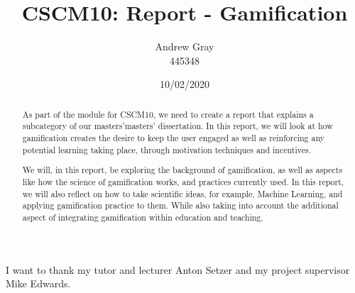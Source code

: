 \documentclass[11pt, a4paper, twoside, openright]{custard}
\begin{document}
	
	\title{CSCM10: Report - Gamification}
	\author{Andrew Gray\protect\\{\normalsize 445348}}
	
	
	
	\date{10/02/2020}
	
	\frontmatter%
	\maketitle
	\cleardoublepage

	\begin{abstract}
		\vspace{-2em}
		\setcounter{page}{1}
		
		As part of the module for CSCM10, we need to create a report that explains a subcategory of our masters’masters’ dissertation. In this report, we will look at how gamification creates the desire to keep the user engaged as well as reinforcing any potential learning taking place, through motivation techniques and incentives.  
		
		We will, in this report, be exploring the background of gamification, as well as aspects like how the science of gamification works, and practices currently used. In this report, we will also reflect on how to take scientific ideas, for example, Machine Learning, and applying gamification practice to them. While also taking into account the additional aspect of integrating gamification within education and teaching.
	\end{abstract}
	
	\begin{Acknowledgements}
		I want to thank my tutor and lecturer Anton Setzer and my project supervisor Mike Edwards. 
	\end{Acknowledgements}
	
\end{document}
